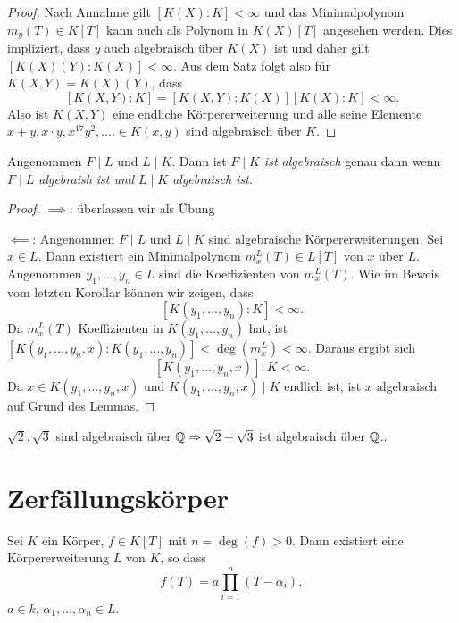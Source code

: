 \begin{proof}
	Nach Annahme gilt $[K(X) : K] < \infty$ und das Minimalpolynom $m_{y}(T) \in K[T]$ kann auch als
	Polynom in $K(X)[T]$ angesehen werden. Dies impliziert, dass $y$ auch algebraisch über $K(X)$ ist
	und daher gilt $[K(X)(Y) : K(X)] < \infty$. Aus dem Satz folgt also für $K(X,Y) = K(X)(Y)$, dass
	\[
		[K(X,Y):K] = [K(X,Y) : K(X)] [K(X) : K] < \infty
	.\] 
	Also ist $K(X,Y)$ eine endliche Körpererweiterung und alle seine Elemente
	$x+y, x\cdot y, x^{17} y^2, \ldots. \in K(x,y)$ sind algebraisch über $K$.
\end{proof}

\begin{corollary}
	Angenommen $F \mid L$ und $L \mid K$. Dann ist \emph{$F \mid K $ ist algebraisch} genau dann wenn  \emph{$F \mid L$ algebraish ist und $L \mid K$ algebraisch ist}.
\end{corollary}

\begin{proof}
	$\implies$: überlassen wir als Übung

	$\impliedby$: Angenommen $F \mid L$ und $L \mid K$ sind algebraische Körpererweiterungen. 
	Sei $x \in L$. Dann existiert ein Minimalpolynom $m_{x}^{L}(T) \in L[T]$ von $x$ über $L$.
	Angenommen $y_1,\ldots,y_{n} \in L$ sind die Koeffizienten von $m_{x}^{L}(T)$. Wie im Beweis vom letzten Korollar können wir zeigen, dass 
	\[
		[K(y_1,\ldots,y_{n}) : K] < \infty
	.\] 
	Da $m_{x}^{L}(T)$ Koeffizienten in $K(y_1,\ldots,y_{n})$ hat, ist $[K(y_1,\ldots,y_{n},x) : K(y_1,\ldots,y_{n})] < \deg(m_{x}^{L}) < \infty$.
	Daraus ergibt sich
	\[
		[K(y_1,\ldots,y_{n},x)] : K < \infty
	.\] 
	Da $x \in K(y_1,\ldots,y_{n},x)$ und $K(y_1,\ldots,y_{n},x) \mid K$ endlich ist, ist $x$ algebraisch auf Grund des Lemmas.
\end{proof}

\begin{eg}
	$\sqrt{2}, \sqrt{3}$ sind algebraisch über $\mathbb{Q} \Rightarrow \sqrt{2} + \sqrt{3}$ ist algebraisch über $\mathbb{Q}$..
\end{eg}

\section{Zerfällungskörper}

\begin{theorem}[Kronecker]
	Sei $K$ ein Körper, $f \in K[T]$ mit $n = \deg(f) > 0$. Dann existiert eine Körpererweiterung $L$ von $K$, so dass
	\[
		f(T) = a \prod_{i=1}^{n} (T-\alpha_{i}),
	\] 
	$a \in k$, $\alpha_1,\ldots,\alpha_{n} \in L$.
\end{theorem}

